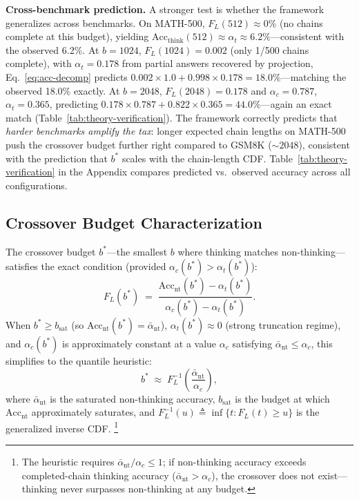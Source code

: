 \noindent
\textbf{Cross-benchmark prediction.}
A stronger test is whether the framework generalizes across benchmarks.
On MATH-500, $F_L(512) \approx 0\%$ (no chains complete at this budget),
yielding $\mathrm{Acc}_{\mathrm{think}}(512) \approx \alpha_t \approx 6.2\%$---consistent with the observed 6.2\%.
At $b{=}1024$, $F_L(1024) = 0.002$ (only 1/500 chains complete), with $\alpha_t = 0.178$ from partial answers recovered by projection, Eq.~\eqref{eq:acc-decomp} predicts $0.002 \times 1.0 + 0.998 \times 0.178 = 18.0\%$---matching the observed 18.0\% exactly.
At $b{=}2048$, $F_L(2048) = 0.178$ and $\alpha_c = 0.787$, $\alpha_t = 0.365$, predicting $0.178 \times 0.787 + 0.822 \times 0.365 = 44.0\%$---again an exact match (Table~\ref{tab:theory-verification}).
The framework correctly predicts that \emph{harder benchmarks amplify the tax}: longer expected chain lengths on MATH-500 push the crossover budget further right compared to GSM8K (${\sim}2048$), consistent with the prediction that $b^*$ scales with the chain-length CDF.
Table~\ref{tab:theory-verification} in the Appendix compares predicted
vs.\ observed accuracy across all configurations.

\subsection{Crossover Budget Characterization}
\label{sec:theory:crossover}

\begin{proposition}
\label{prop:crossover}
The crossover budget $b^*$---the smallest $b$ where thinking matches
non-thinking---satisfies the exact condition
(provided $\alpha_c(b^*) > \alpha_t(b^*)$):
\begin{equation}
  F_L(b^*) \;=\;
    \frac{\mathrm{Acc}_{\mathrm{nt}}(b^*) - \alpha_t(b^*)}
         {\alpha_c(b^*) - \alpha_t(b^*)}.
  \label{eq:crossover-exact}
\end{equation}
When $b^* \ge b_{\mathrm{sat}}$ (so
$\mathrm{Acc}_{\mathrm{nt}}(b^*) = \bar{\alpha}_{\mathrm{nt}}$),
$\alpha_t(b^*) \approx 0$ (strong truncation regime), and
$\alpha_c(b^*)$ is approximately constant at a value $\alpha_c$
satisfying $\bar{\alpha}_{\mathrm{nt}} \le \alpha_c$,
this simplifies to the quantile heuristic:
\begin{equation}
  b^* \;\approx\; F_L^{-1}\!\!\left(
    \frac{\bar{\alpha}_{\mathrm{nt}}}{\alpha_c}\right),
  \label{eq:crossover}
\end{equation}
where $\bar{\alpha}_{\mathrm{nt}}$ is the saturated non-thinking accuracy,
$b_{\mathrm{sat}}$ is the budget at which $\mathrm{Acc}_{\mathrm{nt}}$
approximately saturates, and
$F_L^{-1}(u) \triangleq \inf\{t : F_L(t) \ge u\}$ is the
generalized inverse CDF.%
\footnote{The heuristic requires
$\bar{\alpha}_{\mathrm{nt}} / \alpha_c \le 1$; if non-thinking accuracy
exceeds completed-chain thinking accuracy ($\bar{\alpha}_{\mathrm{nt}} >
\alpha_c$), the crossover does not exist---thinking never surpasses
non-thinking at any budget.}
\end{proposition}

